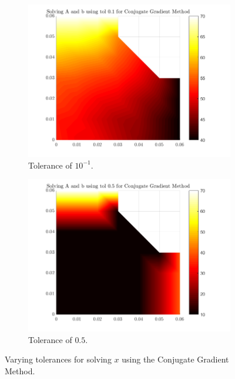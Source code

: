 \documentclass[12pt,a4paper]{article}
\begin{document}
\begin{figure}[H]
\begin{subfigure}[b]{0.48\textwidth}
		\includegraphics[width=\linewidth]{images/ConjugateComparisontol0-1.png}
		\caption{Tolerance of $10^{-1}$.}
		\label{fig:Conjugatetol0.1}
	\end{subfigure}
	\hfill
	\begin{subfigure}[b]{0.48\textwidth}
		\centering
		\includegraphics[width=\linewidth]{images/ConjugateComparisontol0-5.png}
		\caption{Tolerance of $0.5$.}
		\label{fig:Conjugatetol0.5}
	\end{subfigure}
	\caption{Varying tolerances for solving $x$ using the Conjugate Gradient Method.}
    \label{fig:tolerance}
\end{figure}
\end{document}
